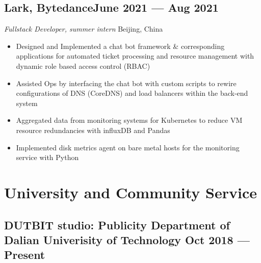 \documentclass[a4,12pt]{article}
\newcommand{\subtext}[1]{
#1\par\vspace{-0.3cm}}
\newenvironment{zitemize}{
\begin{itemize}\itemsep0pt \parskip0pt \parsep1pt}
{\end{itemize}\vspace{-0.5cm}}
\begin{document}
\subsection*{Lark, Bytedance\hfill June 2021 --- Aug 2021} 
\subtext{\textit{Fullstack Developer, summer intern } \hfill Beijing, China} 
    \begin{zitemize}
        \item Designed and Implemented a chat bot framework \& corresponding applications for automated ticket processing and resource management with dynamic role based access control (RBAC)
        \item Assisted Ops by interfacing the chat bot with custom scripts to rewire configurations of DNS (CoreDNS) and load balancers within the back-end system
        \item Aggregated data from monitoring systems for Kubernetes to reduce VM resource redundancies with influxDB and Pandas
        \item Implemented disk metrics agent on bare metal hosts for the monitoring service with Python
    \end{zitemize}


\section{\textbf{University and Community Service}} %



\subsection*{DUTBIT studio: {\normalsize\normalfont Publicity Department of Dalian Univerisity of Technology} \hfill  Oct 2018 --- Present} 
\end{document}
